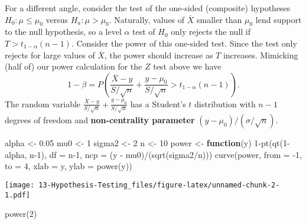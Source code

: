 \documentclass[
]{book}
\newenvironment{Shaded}{\begin{snugshade}}{\end{snugshade}}
\newcommand{\AttributeTok}[1]{\textcolor[rgb]{0.77,0.63,0.00}{#1}}
\newcommand{\ControlFlowTok}[1]{\textcolor[rgb]{0.13,0.29,0.53}{\textbf{#1}}}
\newcommand{\DecValTok}[1]{\textcolor[rgb]{0.00,0.00,0.81}{#1}}
\newcommand{\FloatTok}[1]{\textcolor[rgb]{0.00,0.00,0.81}{#1}}
\newcommand{\FunctionTok}[1]{\textcolor[rgb]{0.00,0.00,0.00}{#1}}
\newcommand{\NormalTok}[1]{#1}
\newcommand{\OtherTok}[1]{\textcolor[rgb]{0.56,0.35,0.01}{#1}}
\newcommand{\SpecialCharTok}[1]{\textcolor[rgb]{0.00,0.00,0.00}{#1}}
\newcommand{\StringTok}[1]{\textcolor[rgb]{0.31,0.60,0.02}{#1}}
\begin{document}
For a different angle, consider the test of the one-sided (composite) hypotheses \(H_0:\mu \leq \mu_0\) versus \(H_a:\mu > \mu_0\). Naturally, values of \(\overline X\) smaller than \(\mu_0\) lend support to the null hypothesis, so a level \(\alpha\) test of \(H_0\) only rejects the null if \(T > t_{1-\alpha}(n-1)\). Consider the power of this one-sided test. Since the test only rejects for large values of \(\overline X\), the power should increase as \(T\) increases. Mimicking (half of) our power calculation for the \(Z\) test above we have
\[1-\beta = P\left(\frac{\overline X - y}{S/\sqrt{n}} + \frac{y - \mu_0}{S/\sqrt{n}} > t_{1-\alpha}(n-1)\right).\]
The random variable \(\frac{\overline X - y}{S/\sqrt{n}} + \frac{y - \mu_0}{S/\sqrt{n}}\) has a Student's \(t\) distribution with \(n-1\) degrees of freedom and \textbf{non-centrality parameter} \((y-\mu_0)/(\sigma / \sqrt{n})\).

\begin{Shaded}
\begin{Highlighting}[]
\NormalTok{alpha }\OtherTok{\textless{}{-}} \FloatTok{0.05}
\NormalTok{mu0 }\OtherTok{\textless{}{-}} \DecValTok{1}
\NormalTok{sigma2 }\OtherTok{\textless{}{-}} \DecValTok{2}
\NormalTok{n }\OtherTok{\textless{}{-}} \DecValTok{10}
\NormalTok{power }\OtherTok{\textless{}{-}} \ControlFlowTok{function}\NormalTok{(y)  }\DecValTok{1}\SpecialCharTok{{-}}\FunctionTok{pt}\NormalTok{(}\FunctionTok{qt}\NormalTok{(}\DecValTok{1}\SpecialCharTok{{-}}\NormalTok{alpha, n}\DecValTok{{-}1}\NormalTok{), }\AttributeTok{df =}\NormalTok{ n}\DecValTok{{-}1}\NormalTok{, }\AttributeTok{ncp =}\NormalTok{ (y }\SpecialCharTok{{-}}\NormalTok{ mu0)}\SpecialCharTok{/}\NormalTok{(}\FunctionTok{sqrt}\NormalTok{(sigma2}\SpecialCharTok{/}\NormalTok{n)))}
\FunctionTok{curve}\NormalTok{(power, }\AttributeTok{from =} \SpecialCharTok{{-}}\DecValTok{1}\NormalTok{, }\AttributeTok{to =} \DecValTok{4}\NormalTok{, }\AttributeTok{xlab =} \StringTok{\textquotesingle{}y\textquotesingle{}}\NormalTok{, }\AttributeTok{ylab =} \StringTok{\textquotesingle{}power(y)\textquotesingle{}}\NormalTok{)  }
\end{Highlighting}
\end{Shaded}

\texttt{[image: 13-Hypothesis-Testing\_files/figure-latex/unnamed-chunk-2-1.pdf]}

\begin{Shaded}
\begin{Highlighting}[]
\FunctionTok{power}\NormalTok{(}\DecValTok{2}\NormalTok{)}
\end{Highlighting}
\end{Shaded}
\end{document}
